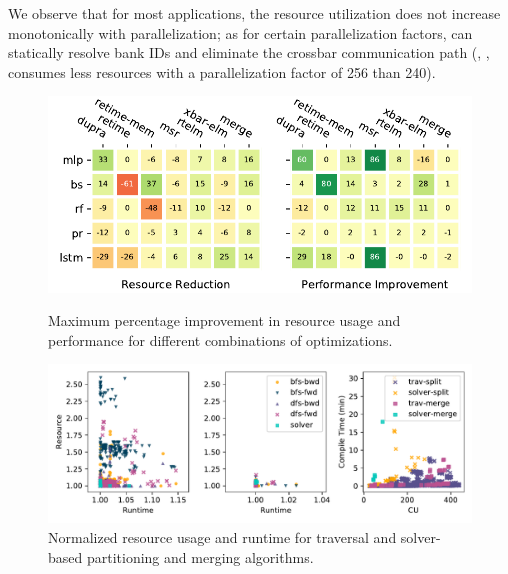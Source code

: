 We observe that for most applications, the resource utilization does not increase monotonically with parallelization; as for certain parallelization factors, \name{} can statically resolve bank IDs and eliminate the crossbar communication path (\eg, , consumes less resources with a parallelization factor of 256 than 240).


\begin{figure}
\centering
\includegraphics[width=1\columnwidth]{figures/heat.pdf}
\caption{Maximum percentage improvement in resource usage and performance for different combinations of optimizations.}
\label{fig:heat}
\centering
  \includegraphics[width=1\columnwidth]{figures/algo.pdf}
  \caption{Normalized resource usage and runtime for traversal and solver-based partitioning and merging algorithms.}
  \label{fig:resource-runtime}
\end{figure}


